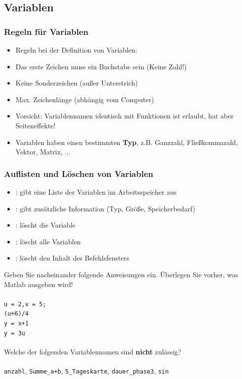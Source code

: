    \subsection{Variablen}
    \begin{frame}
      \frametitle{Regeln für Variablen}
      \begin{itemize}
        \item Regeln bei der Definition von Variablen:
        \item Das erste Zeichen muss ein Buchstabe sein (Keine Zahl!)
        \item Keine Sonderzeichen (außer Unterstrich)
        \item Max. Zeichenlänge (abhängig vom Computer)
        \item \alert{Vorsicht:} Variablennamen identisch mit Funktionen ist erlaubt, hat aber Seiteneffekte!
        \item Variablen haben einen bestimmten \textbf{Typ}, z.B. Ganzzahl, Fließkommazahl, Vektor, Matrix, ...
      \end{itemize}
    \end{frame}

    \begin{frame}
      \frametitle{Auflisten und Löschen von Variablen}
      \begin{itemize}
        \item {}: gibt eine Liste der Variablen im Arbeitsspeicher aus
        \item {}: gibt zusätzliche Information (Typ, Größe, Speicherbedarf)
        \item {}: löscht die Variable
        \item {}: löscht alle Variablen
        \item {}: löscht den Inhalt des Befehlsfensters
      \end{itemize}
    \end{frame}

    \secMexercise
    \begin{frame}
      \frameMexercise
      \begin{exercise}
          \sloppy
          Geben Sie nacheinander folgende Anweisungen ein. Überlegen Sie vorher, was Matlab ausgeben wird! \\ \\
          \texttt{u = 2,v = 5;} \keys{\return}\\
          \texttt{(u+6)/4} \keys{\return}\\
          \texttt{y = x+1} \keys{\return}\\
          \texttt{y = 3u} \keys{\return}\\ \\
          Welche der folgenden Variablennamen sind \textbf{nicht} zulässig? \\ \\
          \texttt{anzahl}, \texttt{Summe\_a+b}, \texttt{5\_Tageskarte}, \texttt{dauer\_phase3}, \texttt{sin}
      \end{exercise}
    \end{frame}

